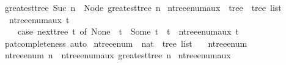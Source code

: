 \begin{isabellebody}
{\isacharbar}{\kern0pt}\ {\isachardoublequoteopen}greatest{\isacharunderscore}{\kern0pt}tree\ {\isacharparenleft}{\kern0pt}Suc\ n{\isacharparenright}{\kern0pt}\ {\isacharequal}{\kern0pt}\ Node\ {\isacharbrackleft}{\kern0pt}greatest{\isacharunderscore}{\kern0pt}tree\ n{\isacharbrackright}{\kern0pt}{\isachardoublequoteclose}\isanewline
\isanewline
{}\isamarkupfalse%
\ n{\isacharunderscore}{\kern0pt}tree{\isacharunderscore}{\kern0pt}enum{\isacharunderscore}{\kern0pt}aux\ {\isacharcolon}{\kern0pt}{\isacharcolon}{\kern0pt}\ {\isachardoublequoteopen}tree\ {\isasymRightarrow}\ tree\ list{\isachardoublequoteclose}\ \isanewline
\ \ {\isachardoublequoteopen}n{\isacharunderscore}{\kern0pt}tree{\isacharunderscore}{\kern0pt}enum{\isacharunderscore}{\kern0pt}aux\ t\ {\isacharequal}{\kern0pt}\isanewline
\ \ \ \ {\isacharparenleft}{\kern0pt}case\ next{\isacharunderscore}{\kern0pt}tree\ t\ of\ None\ {\isasymRightarrow}\ {\isacharbrackleft}{\kern0pt}t{\isacharbrackright}{\kern0pt}\ {\isacharbar}{\kern0pt}\ Some\ t{\isacharprime}{\kern0pt}\ {\isasymRightarrow}\ t\ {\isacharhash}{\kern0pt}\ n{\isacharunderscore}{\kern0pt}tree{\isacharunderscore}{\kern0pt}enum{\isacharunderscore}{\kern0pt}aux\ t{\isacharprime}{\kern0pt}{\isacharparenright}{\kern0pt}{\isachardoublequoteclose}\isanewline
%
\isadelimproof
\ \ %
\endisadelimproof
%
\isatagproof
{}\isamarkupfalse%
\ pat{\isacharunderscore}{\kern0pt}completeness\ auto%
\endisatagproof
{\isafoldproof}%
%
\isadelimproof
\isanewline
%
\endisadelimproof
\isanewline
{}\isamarkupfalse%
\ n{\isacharunderscore}{\kern0pt}tree{\isacharunderscore}{\kern0pt}enum\ {\isacharcolon}{\kern0pt}{\isacharcolon}{\kern0pt}\ {\isachardoublequoteopen}nat\ {\isasymRightarrow}\ tree\ list{\isachardoublequoteclose}\ \isanewline
\ \ {\isachardoublequoteopen}n{\isacharunderscore}{\kern0pt}tree{\isacharunderscore}{\kern0pt}enum\ {}\ {\isacharequal}{\kern0pt}\ {\isacharbrackleft}{\kern0pt}{\isacharbrackright}{\kern0pt}{\isachardoublequoteclose}\isanewline
{\isacharbar}{\kern0pt}\ {\isachardoublequoteopen}n{\isacharunderscore}{\kern0pt}tree{\isacharunderscore}{\kern0pt}enum\ n\ {\isacharequal}{\kern0pt}\ n{\isacharunderscore}{\kern0pt}tree{\isacharunderscore}{\kern0pt}enum{\isacharunderscore}{\kern0pt}aux\ {\isacharparenleft}{\kern0pt}greatest{\isacharunderscore}{\kern0pt}tree\ n{\isacharparenright}{\kern0pt}{\isachardoublequoteclose}\isanewline
\isanewline
{}\isamarkupfalse%
\ n{\isacharunderscore}{\kern0pt}tree{\isacharunderscore}{\kern0pt}enum{\isacharunderscore}{\kern0pt}aux\isanewline

\end{isabellebody}

